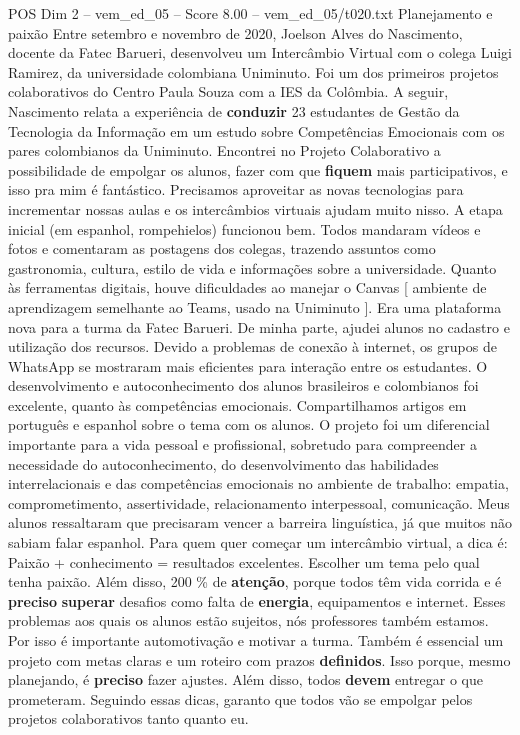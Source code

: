 \begin{textsample}{POS Dim 2 – vem\_ed\_05 – Score 8.00 – vem\_ed\_05/t020.txt}  \label{ex:f2_pos_090}
Planejamento e paixão Entre setembro e novembro de 2020, Joelson Alves do Nascimento, docente da Fatec Barueri, desenvolveu um Intercâmbio Virtual com o colega Luigi Ramirez, da universidade colombiana Uniminuto.
Foi um dos primeiros projetos colaborativos do Centro Paula Souza com a IES da Colômbia.
A seguir, Nascimento relata a experiência de \textbf{conduzir} 23 estudantes de Gestão da Tecnologia da Informação em um estudo sobre Competências Emocionais com os pares colombianos da Uniminuto.
Encontrei no Projeto Colaborativo a possibilidade de empolgar os alunos, fazer com que \textbf{fiquem} mais participativos, e isso pra mim é fantástico.
Precisamos aproveitar as novas tecnologias para incrementar nossas aulas e os intercâmbios virtuais ajudam muito nisso.
A etapa inicial (em espanhol, rompehielos) funcionou bem.
Todos mandaram vídeos e fotos e comentaram as postagens dos colegas, trazendo assuntos como gastronomia, cultura, estilo de vida e informações sobre a universidade.
Quanto às ferramentas digitais, houve dificuldades ao manejar o Canvas [ ambiente de aprendizagem semelhante ao Teams, usado na Uniminuto ].
Era uma plataforma nova para a turma da Fatec Barueri.
De minha parte, ajudei alunos no cadastro e utilização dos recursos.
Devido a problemas de conexão à internet, os grupos de WhatsApp se mostraram mais eficientes para interação entre os estudantes.
O desenvolvimento e autoconhecimento dos alunos brasileiros e colombianos foi excelente, quanto às competências emocionais.
Compartilhamos artigos em português e espanhol sobre o tema com os alunos.
O projeto foi um diferencial importante para a vida pessoal e profissional, sobretudo para compreender a necessidade do autoconhecimento, do desenvolvimento das habilidades interrelacionais e das competências emocionais no ambiente de trabalho: empatia, comprometimento, assertividade, relacionamento interpessoal, comunicação.
Meus alunos ressaltaram que precisaram vencer a barreira linguística, já que muitos não sabiam falar espanhol.
Para quem quer começar um intercâmbio virtual, a dica é: Paixão + conhecimento = resultados excelentes.
Escolher um tema pelo qual tenha paixão.
Além disso, 200 \% de \textbf{atenção}, porque todos têm vida corrida e é \textbf{preciso} \textbf{superar} desafios como falta de \textbf{energia}, equipamentos e internet.
Esses problemas aos quais os alunos estão sujeitos, nós professores também estamos.
Por isso é importante automotivação e motivar a turma.
Também é essencial um projeto com metas claras e um roteiro com prazos \textbf{definidos}.
Isso porque, mesmo planejando, é \textbf{preciso} fazer ajustes.
Além disso, todos \textbf{devem} entregar o que prometeram.
Seguindo essas dicas, garanto que todos vão se empolgar pelos projetos colaborativos tanto quanto eu.

\end{textsample}
